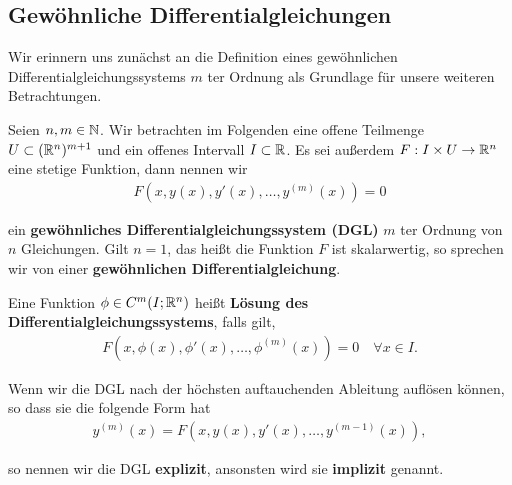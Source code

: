 \subsection{Gewöhnliche Differentialgleichungen}
\label{\detokenize{ode/repetition:gewohnliche-differentialgleichungen}}
\par
Wir erinnern uns zunächst an die Definition eines gewöhnlichen Differentialgleichungssystems \(m\) ter Ordnung als Grundlage für unsere weiteren Betrachtungen.
\label{ode/repetition:def:DGL}
\begin{definition}{}{}



\par
Seien \(n,m \in \mathbb{N}\).
Wir betrachten im Folgenden eine offene Teilmenge \(U\subset (\mathbb{R}^n)^{m+1}\) und ein offenes Intervall \(I\subset\mathbb{R}\).
Es sei außerdem \(F:I\times U\rightarrow\mathbb{R}^n\) eine stetige Funktion, dann nennen wir
\begin{align}\label{equation:ode/repetition:eq:DGL}
F(x,y(x),y'(x),\ldots,y^{(m)}(x)) = 0
\end{align}
\par
ein \textbf{gewöhnliches Differentialgleichungssystem (DGL)} \(m\) ter Ordnung von \(n\) Gleichungen.
Gilt \(n=1\), das heißt die Funktion \(F\) ist skalarwertig, so sprechen wir von einer \textbf{gewöhnlichen Differentialgleichung}.

\par
Eine Funktion \(\phi\in C^m(I;\mathbb{R}^n)\) heißt \textbf{Lösung des Differentialgleichungssystems}, falls gilt,
\begin{align*}
F(x, \phi(x), \phi'(x), \ldots, \phi^{(m)}(x)) = 0 \quad \forall x\in I.
\end{align*}
\par
Wenn wir die DGL nach der höchsten auftauchenden Ableitung auflösen können, so dass sie die folgende Form hat
\begin{align*}
y^{(m)}(x) = F(x,y(x),y'(x),\ldots,y^{(m-1)}(x)),
\end{align*}
\par
so nennen wir die DGL \textbf{explizit}, ansonsten wird sie \textbf{implizit} genannt.
\end{definition}

